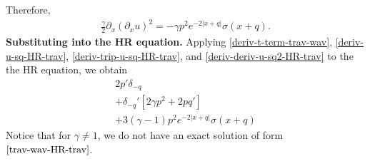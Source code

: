 \documentclass[12pt,reqno]{amsart}
\numberwithin{equation}{section}  %
\numberwithin{figure}{section}
\newcommand{\p}{\partial}
\theoremstyle{plain}  %
\theoremstyle{definition}
\begin{document}
%
%
Therefore,
%
%
\begin{equation}
  \begin{split}
    \label{deriv-deriv-u-sq2-HR-trav}
    \frac{\gamma}{2}\p_x (\p_x u)^2
    = -\gamma p^2 e^{-2 | x+q |} \sigma(x+q). 
  \end{split}
\end{equation}
%
{\bf Substituting into the HR equation.}
%
Applying \eqref{deriv-t-term-trav-wav}, \eqref{deriv-u-sq-HR-trav},
\eqref{deriv-trip-u-sq-HR-trav}, and \eqref{deriv-deriv-u-sq2-HR-trav} to the
the HR equation, we
obtain
%
%
%
\begin{gather}
  \label{ode-term-1-HR-trav}
  2p'\delta_{-q} 
  \\
  \label{ode-term-2-HR-trav}
  + \delta_{-q}'  \left [2 \gamma p^{2}  + 2pq' \right ]
  \\
  \label{problem-term-HR-trav}
  +3(\gamma -1)p^{2} e^{-2| x+q |}\sigma(x+q) 
\end{gather}
%
Notice that for $\gamma \neq 1$, we do not have an exact solution of form
$\eqref{trav-wav-HR-trav}$. 
%
%
\end{document}
